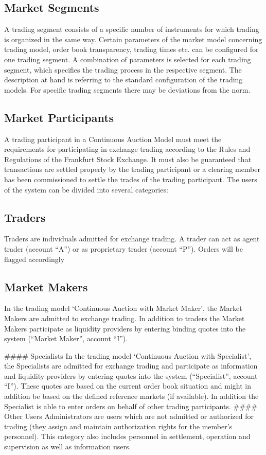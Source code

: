 \documentclass{article}
\begin{document}
\subsection{ Market Segments }
A trading segment consists of a specific number of instruments for which trading is organized in the same
way. Certain parameters of the market model concerning trading model, order book transparency, trading
times etc. can be configured for one trading segment. A combination of parameters is selected for each
trading segment, which specifies the trading process in the respective segment.
The description at hand is referring to the standard configuration of the trading models. For specific trading
segments there may be deviations from the norm. 

\subsection{ Market Participants }
A trading participant in a Continuous Auction Model must meet the requirements for participating in
exchange trading according to the Rules and Regulations of the Frankfurt Stock Exchange. It must also be
guaranteed that transactions are settled properly by the trading participant or a clearing member has been
commissioned to settle the trades of the trading participant.
The users of the system can be divided into several categories:


\subsection{Traders}

Traders are individuals admitted for exchange trading. A trader can act as agent trader (account “A”)
or as proprietary trader (account “P”). Orders will be flagged accordingly
\subsection {Market Makers }
In the trading model ‘Continuous Auction with Market Maker’, the Market Makers are admitted to
exchange trading. In addition to traders the Market Makers participate as liquidity providers by
entering binding quotes into the system (“Market Maker”, account “I”).

####  Specialists
In the trading model ‘Continuous Auction with Specialist’, the Specialists are admitted for exchange
trading and participate as information and liquidity providers by entering quotes into the system
(“Specialist”, account “I”). These quotes are based on the current order book situation and might in
addition be based on the defined reference markets (if available). In addition the Specialist is able to
enter orders on behalf of other trading participants.
#### Other Users
Administrators are users which are not admitted or authorized for trading (they assign and maintain
authorization rights for the member’s personnel). This category also includes personnel in
settlement, operation and supervision as well as information users.
\end{document}
